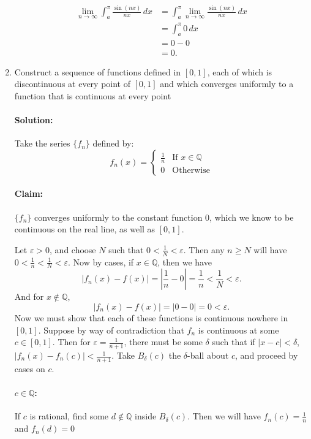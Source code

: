\documentclass{article}
\begin{document}
\begin{enumerate}
  \begin{align*}
  \lim_{n \to \infty} \int_{a}^{\pi} \frac{\sin(nx)}{nx} \, d x 
  &=\int_{a}^{\pi} \lim_{n \to \infty} \frac{\sin(nx)}{nx} \, d x \\
  &=\int_{a}^{\pi} 0 \, d x \\
  &= 0-0 \\
  &= 0
  .\end{align*}

\item Construct a sequence of functions defined in $[0,1]$, each of which is discontinuous at every point of $[0,1]$ and which converges uniformly to a function that is continuous at every point 

  \paragraph{Solution: }Take the series $\{f_n\} $ defined by:
  \[
    f_n(x)=\begin{cases}
      \frac{1}{n}&\text{If } x\in \mathbb{Q}\\
      0&\text{Otherwise}
    \end{cases}
  \] 
  \paragraph{Claim:}  $\{f_n\} $ converges uniformly to the constant function $0$, which we know to be continuous on the real line, as well as $[0,1]$. 

  Let $\varepsilon>0$, and choose $N$ such that $0<\frac{1}{N}<\varepsilon$.
  Then any $n\geq N$ will have $0<\frac{1}{n}<\frac{1}{N}<\varepsilon$. Now by cases, if $x\in \mathbb{Q}$, then we have 
  \[
  |f_n(x)-f(x)|=\left|\frac{1}{n}-0\right|=\frac{1}{n}<\frac{1}{N}<\varepsilon
  .\] 
  And for $x\not\in \mathbb{Q}$, 
\[
  |f_n(x)-f(x)|=\left|0-0\right|=0<\varepsilon
.\] 
Now we must show that each of these functions is continuous nowhere in $[0,1]$.  Suppose by way of contradiction that $f_n$ is continuous at some $c\in [0,1]$. Then for $\varepsilon=\frac{1}{n+1}$, there must be some $\delta$ such that if $|x-c|<\delta$, $|f_n(x)-f_n(c)|<\frac{1}{n+1}$. Take $B_\delta(c)$ the $\delta$-ball about $c$, and proceed by cases on $c$.
\paragraph{$c\in \mathbb{Q}$:} If $c$ is rational, find some $d\not\in\mathbb{Q} $ inside $B_{\delta}(c)$. Then we will have $f_n(c)=\frac{1}{n}$ and $f_n(d)=0$

\end{enumerate}
\end{document}
